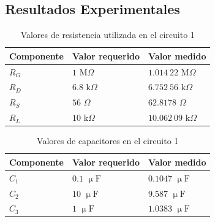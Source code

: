 \documentclass[journal]{IEEEtran}
\begin{document}


\subsection{Resultados Experimentales}

\begin{table}[H]
        \centering
        \renewcommand{\arraystretch}{1.5}
        \caption{Valores de resistencia utilizada en el circuito 1}
        \begin{tabular}{ >{\centering\arraybackslash}m{2.5cm} >{\centering\arraybackslash}m{2.5cm} >{\centering\arraybackslash}m{2.5cm} }
                \hline
            \centering
            Componente & Valor requerido & Valor medido\\ 
            \hline
            \centering
            $R_G$ & $1$ $\mathrm{M}\Omega$ & $1.014~22$ $\mathrm{M}\Omega$ \\ 
            $R_D$ & $6.8$ $\mathrm{k}\Omega$ & $6.752~56$ $\mathrm{k}\Omega$ \\
            $R_S$ & $56$ $\Omega$ & $62.8178$ $\Omega$ \\
            $R_L$ & $10$ $\mathrm{k}\Omega$ & $10.062~09$ $\mathrm{k}\Omega$ \\
            \hline
        \end{tabular}
        \label{tabla1}
    \end{table}
    
\begin{table}[H]
        \centering
        \renewcommand{\arraystretch}{1.5}
        \caption{Valores de capacitores en el circuito 1}
        \begin{tabular}{ >{\centering\arraybackslash}m{2.5cm} >{\centering\arraybackslash}m{2.5cm} >{\centering\arraybackslash}m{2.5cm} }
                \hline
            Componente & Valor requerido & Valor medido\\ 
            \hline
            \centering
            $C_1$ & $0.1$ $\upmu\mathrm{F}$ & $0.1047$ $\upmu\mathrm{F}$ \\ 
            $C_2$ & $10$ $\upmu\mathrm{F}$ & $9.587$ $\upmu\mathrm{F}$ \\
            $C_3$ & $1$ $\upmu\mathrm{F}$ & $1.0383$ $\upmu\mathrm{F}$ \\
            \hline
        \end{tabular}
        \label{tabla2}
    \end{table}    
\end{document}
